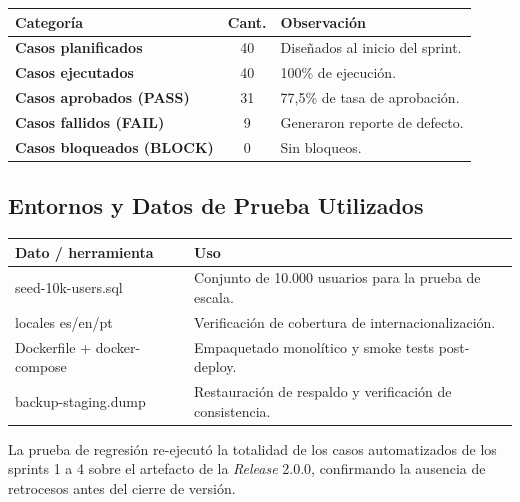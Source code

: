 \vspace{0.1cm}
\noindent
\renewcommand{\arraystretch}{1.35}
\fontsize{8.5}{10.2}\selectfont\sffamily
\begin{tabularx}{\textwidth}{|>{\bfseries\color{colorPrimario}}p{4.6cm}|c|Y|}
\hline
{}
\sffamily\textbf{Categoría} & \sffamily\textbf{Cant.} & \sffamily\textbf{Observación} \\
\hline
Casos planificados & 40 & Diseñados al inicio del sprint. \\ \hline
{}
Casos ejecutados & 40 & 100\% de ejecución. \\ \hline
Casos aprobados (PASS) & 31 & 77,5\% de tasa de aprobación. \\ \hline
{}
Casos fallidos (FAIL) & 9 & Generaron reporte de defecto. \\ \hline
Casos bloqueados (BLOCK) & 0 & Sin bloqueos. \\ \hline
\end{tabularx}

\vspace{0.3cm}

\subsection{Entornos y Datos de Prueba Utilizados}
\label{sec:s5-datos}

\vspace{0.1cm}
\noindent
\renewcommand{\arraystretch}{1.3}
\fontsize{8.5}{10.2}\selectfont\sffamily
\begin{tabularx}{\textwidth}{|>{\ttfamily}p{4.8cm}|Y|}
\hline
{}
\sffamily\textbf{Dato / herramienta} & \sffamily\textbf{Uso} \\
\hline
seed-10k-users.sql & Conjunto de 10.000 usuarios para la prueba de escala. \\ \hline
{}
locales es/en/pt & Verificación de cobertura de internacionalización. \\ \hline
Dockerfile + docker-compose & Empaquetado monolítico y smoke tests post-deploy. \\ \hline
{}
backup-staging.dump & Restauración de respaldo y verificación de consistencia. \\ \hline
\end{tabularx}

\begin{NotaTecnica}
La prueba de regresión  re-ejecutó la totalidad de los casos
automatizados de los sprints 1 a 4 sobre el artefacto de la \textit{Release} 2.0.0,
confirmando la ausencia de retrocesos antes del cierre de versión.
\end{NotaTecnica}

